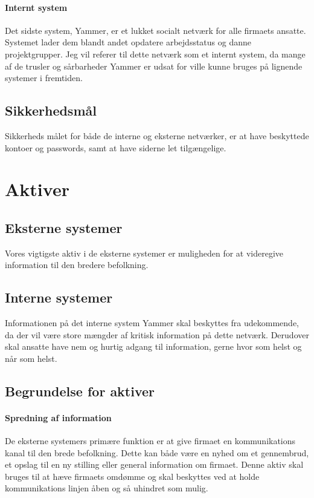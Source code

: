 \documentclass{article}
\begin{document}
\paragraph{Internt system}
Det sidste system, Yammer, er et lukket socialt netværk for alle firmaets ansatte. Systemet lader dem blandt andet opdatere arbejdsstatus og danne projektgrupper. Jeg vil referer til dette netværk som et internt system, da mange af de trusler og sårbarheder Yammer er udsat for ville kunne bruges på lignende systemer i fremtiden.

\subsection{Sikkerhedsmål}

Sikkerheds målet for både de interne og eksterne netværker, er at have beskyttede kontoer og passwords,
samt at have siderne let tilgængelige. 

\section{Aktiver}
\subsection{Eksterne systemer}
Vores vigtigste aktiv i de eksterne systemer er muligheden for at videregive information til den bredere befolkning. 

\subsection{Interne systemer}
Informationen på det interne system Yammer skal beskyttes fra udekommende, da der vil være store mængder af kritisk information på dette netværk. Derudover skal ansatte have nem og hurtig adgang til information, gerne hvor som helst og når som helst.

\subsection{Begrundelse for aktiver}

\paragraph{Spredning af information}
De eksterne systemers primære funktion er at give firmaet en kommunikations kanal til den brede befolkning. Dette kan både være en nyhed om et gennembrud, et opslag til en ny stilling eller general information om firmaet. Denne aktiv skal bruges til at hæve firmaets omdømme og skal beskyttes ved at holde kommunikations linjen åben og så uhindret som mulig.
\end{document}
